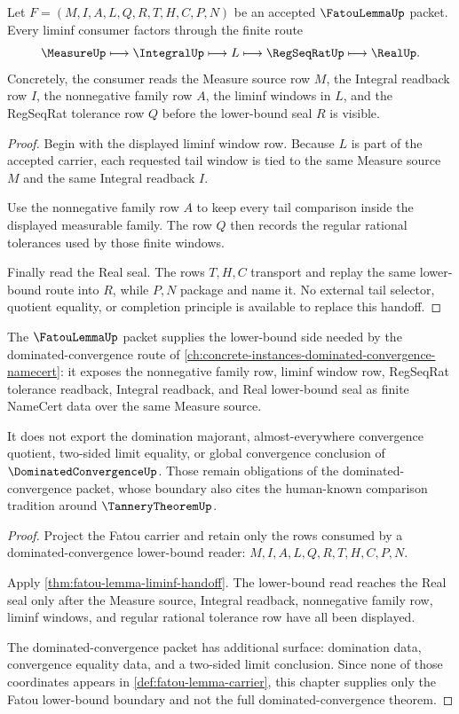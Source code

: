 \begin{theorem}
\label{thm:fatou-lemma-liminf-handoff}
Let $F=(M,I,A,L,Q,R,T,H,C,P,N)$ be an accepted $\FatouLemmaUp$ packet. Every liminf consumer factors through the finite route
$$
\MeasureUp \longmapsto \IntegralUp \longmapsto L \longmapsto \RegSeqRatUp \longmapsto \RealUp .
$$
Concretely, the consumer reads the Measure source row $M$, the Integral readback row $I$, the nonnegative family row $A$, the liminf windows in $L$, and the RegSeqRat tolerance row $Q$ before the lower-bound seal $R$ is visible.
\end{theorem}
\begin{proof}
Begin with the displayed liminf window row. Because $L$ is part of the accepted carrier, each requested tail window is tied to the same Measure source $M$ and the same Integral readback $I$.

Use the nonnegative family row $A$ to keep every tail comparison inside the displayed measurable family. The row $Q$ then records the regular rational tolerances used by those finite windows.

Finally read the Real seal. The rows $T,H,C$ transport and replay the same lower-bound route into $R$, while $P,N$ package and name it. No external tail selector, quotient equality, or completion principle is available to replace this handoff.
\end{proof}

\begin{theorem}
\label{thm:fatou-lemma-dominated-convergence-boundary}
The $\FatouLemmaUp$ packet supplies the lower-bound side needed by the dominated-convergence route of \autoref{ch:concrete-instances-dominated-convergence-namecert}: it exposes the nonnegative family row, liminf window row, RegSeqRat tolerance readback, Integral readback, and Real lower-bound seal as finite NameCert data over the same Measure source.

It does not export the domination majorant, almost-everywhere convergence quotient, two-sided limit equality, or global convergence conclusion of $\DominatedConvergenceUp$. Those remain obligations of the dominated-convergence packet, whose boundary also cites the human-known comparison tradition around $\TanneryTheoremUp$.
\end{theorem}
\begin{proof}
Project the Fatou carrier and retain only the rows consumed by a dominated-convergence lower-bound reader: $M,I,A,L,Q,R,T,H,C,P,N$.

Apply \autoref{thm:fatou-lemma-liminf-handoff}. The lower-bound read reaches the Real seal only after the Measure source, Integral readback, nonnegative family row, liminf windows, and regular rational tolerance row have all been displayed.

The dominated-convergence packet has additional surface: domination data, convergence equality data, and a two-sided limit conclusion. Since none of those coordinates appears in \autoref{def:fatou-lemma-carrier}, this chapter supplies only the Fatou lower-bound boundary and not the full dominated-convergence theorem.
\end{proof}


